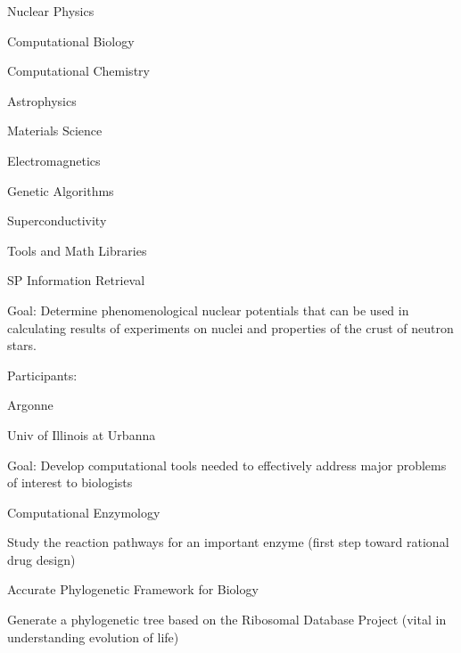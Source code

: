 
\begin{small}
\begin{mainpts}
  \item Nuclear Physics
  \item Computational Biology
  \item Computational Chemistry
  \item Astrophysics
  \item Materials Science
  \item Electromagnetics
  \item Genetic Algorithms
  \item Superconductivity
  \item Tools and Math Libraries
  \item SP Information Retrieval
\end{mainpts}
\end{small}
\ve

\begin{small}
\begin{mainpts}
\item Goal:
Determine phenomenological nuclear
potentials that can be 
used in calculating results of experiments on nuclei and properties of the
crust of neutron stars.  

\item Participants:
\begin{secpts}
\item Argonne
\item Univ of Illinois at Urbanna
\end{secpts}
\end{mainpts}
\end{small}
\ve

\begin{small}


\begin{mainpts}
\item Goal: Develop computational tools needed to effectively address major
problems of interest to biologists

\item Computational Enzymology

Study the reaction pathways for an important enzyme (first step toward
rational drug design)

\item Accurate
Phylogenetic Framework for
Biology 

Generate a phylogenetic tree based on the Ribosomal Database Project (vital in
understanding evolution of life)


\end{mainpts}

\end{small}
\ve

